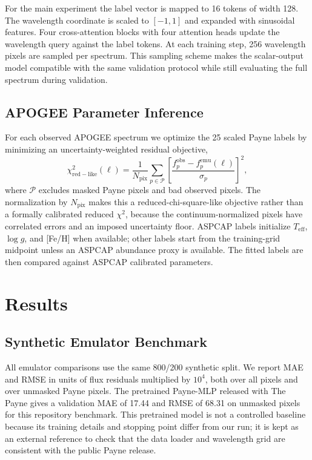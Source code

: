 \documentclass[universe,article,submit,pdftex,moreauthors]{Definitions/mdpi}
\begin{document}
For the main experiment the label vector is mapped to 16 tokens of width 128.
The wavelength coordinate is scaled to $[-1,1]$ and expanded with sinusoidal
features. Four cross-attention blocks with four attention heads update the
wavelength query against the label tokens. At each training step, 256 wavelength
pixels are sampled per spectrum. This sampling scheme makes the scalar-output
model compatible with the same validation protocol while still evaluating the
full spectrum during validation.

\subsection{APOGEE Parameter Inference}

For each observed APOGEE spectrum we optimize the 25 scaled Payne labels by
minimizing an uncertainty-weighted residual objective,
\begin{equation}
    \label{eq:apogee-objective}
    \chi^2_{\mathrm{red-like}}(\boldsymbol{\ell}) =
    \frac{1}{N_{\mathrm{pix}}}
    \sum_{p \in \mathcal{P}}
    \left[
    \frac{f^{\mathrm{obs}}_p -
    f^{\mathrm{emu}}_p(\boldsymbol{\ell})}{\sigma_p}
    \right]^2,
\end{equation}
where $\mathcal{P}$ excludes masked Payne pixels and bad observed pixels. The
normalization by $N_{\mathrm{pix}}$ makes this a reduced-chi-square-like
objective rather than a formally calibrated reduced $\chi^2$, because the
continuum-normalized pixels have correlated errors and an imposed uncertainty
floor.
ASPCAP labels initialize $T_{\mathrm{eff}}$, $\log g$, and [Fe/H] when
available; other labels start from the training-grid midpoint unless an ASPCAP
abundance proxy is available. The fitted labels are then compared against
ASPCAP calibrated parameters.

\section{Results}

\subsection{Synthetic Emulator Benchmark}

All emulator comparisons use the same 800/200 synthetic split. We report MAE
and RMSE in units of flux residuals multiplied by $10^4$, both over all pixels
and over unmasked Payne pixels. The pretrained Payne-MLP released with The
Payne gives a validation MAE of 17.44 and RMSE of 68.31 on unmasked pixels for
this repository benchmark. This pretrained model is not a controlled baseline
because its training details and stopping point differ from our run; it is kept
as an external reference to check that the data loader and wavelength grid are
consistent with the public Payne release.
\end{document}
